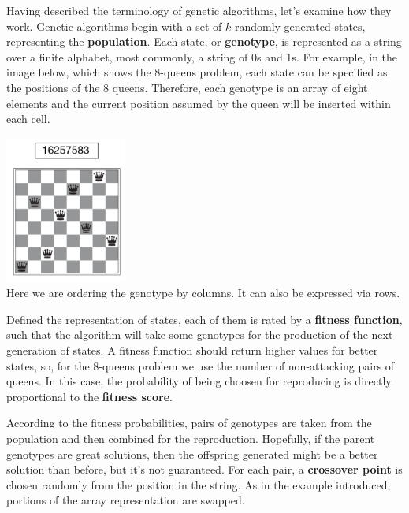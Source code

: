 Having described the terminology of genetic algorithms, let's examine how they work. Genetic algorithms begin with a set of $k$ randomly generated states, representing the
\textbf{population}. Each state, or \textbf{genotype}, is represented as a string over a finite alphabet, most commonly, a string of 0s and 1s. For example, in the image
below, which shows the 8-queens problem, each state can be specified as the positions of the 8 queens. Therefore, each genotype is an array of eight elements and the current 
position assumed by the queen will be inserted within each cell. \vspace{3.5pt}
\begin{center}
    \includegraphics[width=0.3\textwidth]{img/img6.png} \\
    \scriptsize Here we are ordering the genotype by columns. It can also be expressed via rows.
\end{center} \vspace{3.5pt}
Defined the representation of states, each of them is rated by a \textbf{fitness function}, such that the algorithm will take some genotypes for the production of the next 
generation of states. A fitness function should return higher values for better states, so, for the 8-queens problem we use the number of non-attacking pairs of queens. In 
this case, the probability of being choosen for reproducing is directly proportional to the \textbf{fitness score}. \vspace{3.5pt}

According to the fitness probabilities, pairs of genotypes are taken from the population and then combined for the reproduction. Hopefully, if the parent genotypes are great 
solutions, then the offspring generated might be a better solution than before, but it's not guaranteed. For each pair, a \textbf{crossover point} is chosen randomly 
from the position in the string. As in the example introduced, portions of the array representation are swapped. \vspace{3.5pt}

